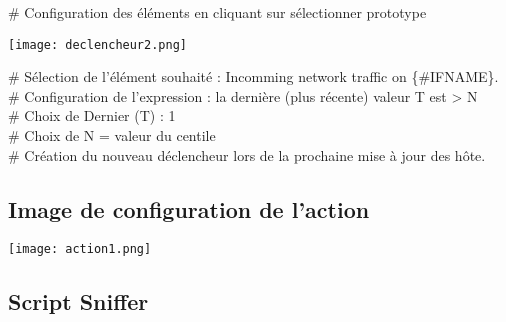 	\# Configuration des éléments en cliquant sur sélectionner prototype \\

\begin{center}

		\texttt{[image: declencheur2.png]}

		\vspace{0.3cm}

\end{center}

	\# Sélection de l'élément souhaité : Incomming network traffic on \{\#IFNAME\}.\\
	\# Configuration de l'expression : la dernière (plus récente) valeur T est > N \\
	\# Choix de Dernier (T) : 1 \\
	\# Choix de N = valeur du centile\\
	\# Création du nouveau déclencheur lors de la prochaine mise à jour des hôte. \\

\newpage
	
\subsection{\label{action}Image de configuration de l'action}

	\begin{center}
		\texttt{[image: action1.png]}
	\end{center}

\newpage

\subsection{\label{sniffer}Script Sniffer}

\vspace{0.3cm}

